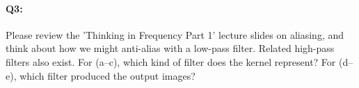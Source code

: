 



\pagebreak
\paragraph{Q3:} Please review the 'Thinking in Frequency Part 1' lecture slides on aliasing, and think about how we might anti-alias with a low-pass filter. Related high-pass filters also exist. For (a--c), which kind of filter does the kernel represent? For (d--e), which filter produced the output images?



